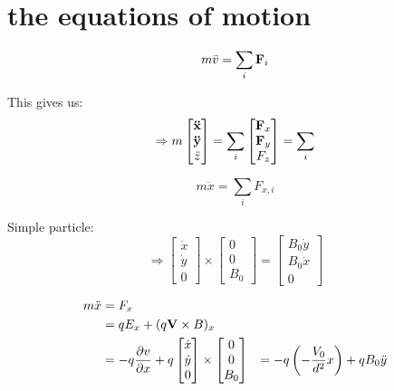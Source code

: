 \documentclass[english,notitlepage,reprint,nofootinbib]{revtex4-1}  %
\begin{document}
\section{the equations of motion}

\begin{equation*}
    m \ddot{v} = \sum_i \vectorbold{F}_i
\end{equation*}

This gives us:
\begin{equation*}
    \Rightarrow m 
    \begin{bmatrix}
        \vectorbold{\ddot{x}} \\
        \vectorbold{\ddot{y}} \\
        \ddot{z}
    \end{bmatrix}
    = \sum_i
    \begin{bmatrix}
        \vectorbold{F}_x \\
        \vectorbold{F}_y \\
        F_z
    \end{bmatrix}
    = \sum_i
\end{equation*}

\begin{equation*}
    m \ddot{x} = \sum_i F_{x,i}
\end{equation*}

Simple particle:
\begin{equation*}
    \Rightarrow
    \begin{bmatrix}
        \dot{x} \\
        \dot{y} \\
        0
    \end{bmatrix}
    \times
    \begin{bmatrix}
        0\\
        0 \\
        B_0
    \end{bmatrix}
    =
    \begin{bmatrix}
        B_0 \dot{y} \\
        B_0 \dot{x} \\
        0
    \end{bmatrix}
\end{equation*}

\begin{align*}
    m \ddot{x} &= F_x \\
    &= q E_x + (q \vectorbold{V} \times B)_x \\
    &= -q \frac{\partial v}{\partial x} + q
    \begin{bmatrix}
        \dot{x} \\
        \dot{y} \\
        0
    \end{bmatrix}
    \times
    \begin{bmatrix}
        0 \\
        0 \\
        B_0
    \end{bmatrix}
    &= - q \left( - \frac{V_0}{d^2} x \right) + q B_0 \ddot{y} \\
\end{align*}
\end{document}
